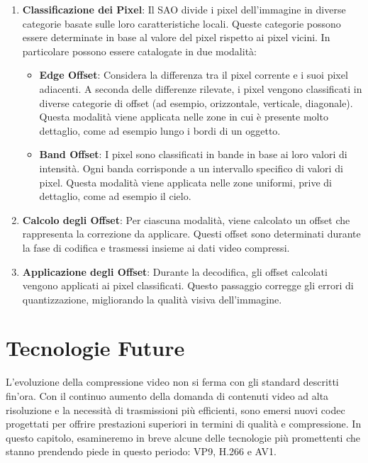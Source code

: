 \documentclass[a4paper,12pt, oneside]{article}
\begin{document}
\begin{enumerate}
    \item \textbf{Classificazione dei Pixel}: Il SAO divide i pixel dell'immagine in diverse categorie basate
    sulle loro caratteristiche locali. Queste categorie possono essere determinate in base al valore del pixel
    rispetto ai pixel vicini. In particolare possono essere catalogate in due modalità:
    
    \begin{itemize}
        \item \textbf{Edge Offset}: Considera la differenza tra il pixel corrente e i suoi pixel adiacenti.
        A seconda delle differenze rilevate, i pixel vengono classificati in diverse categorie di offset (ad
        esempio, orizzontale, verticale, diagonale). Questa modalità viene applicata nelle zone in cui è
        presente molto dettaglio, come ad esempio lungo i bordi di un oggetto.
        \item \textbf{Band Offset}: I pixel sono classificati in bande in base ai loro valori di intensità.
        Ogni banda corrisponde a un intervallo specifico di valori di pixel. Questa modalità viene applicata
        nelle zone uniformi, prive di dettaglio, come ad esempio il cielo.
    \end{itemize}
    
    \item \textbf{Calcolo degli Offset}: Per ciascuna modalità, viene calcolato un offset che rappresenta la
    correzione da applicare. Questi offset sono determinati durante la fase di codifica e trasmessi insieme
    ai dati video compressi.
    \item \textbf{Applicazione degli Offset}: Durante la decodifica, gli offset calcolati vengono applicati
    ai pixel classificati. Questo passaggio corregge gli errori di quantizzazione, migliorando la qualità
    visiva dell'immagine.
\end{enumerate}

\section{Tecnologie Future}
L'evoluzione della compressione video non si ferma con gli standard descritti fin'ora. Con il continuo
aumento della domanda di contenuti video ad alta risoluzione e la necessità di trasmissioni più efficienti,
sono emersi nuovi codec progettati per offrire prestazioni superiori in termini di qualità e compressione.
In questo capitolo, esamineremo in breve alcune delle tecnologie più promettenti che stanno prendendo piede
in questo periodo: VP9, H.266 e AV1.
\end{document}
